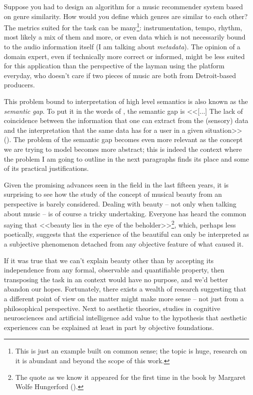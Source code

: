 Suppose you had to design an algorithm for a music recommender system based on genre similarity. How would you define which genres are similar to each other? The metrics suited for the task can be many\footnote{This is just an example built on common sense; the topic is huge, research on it is abundant and beyond the scope of this work.}: instrumentation, tempo, rhythm, most likely a mix of them and more, or even data which is not necessarily bound to the audio information itself (I am talking about \emph{metadata}). The opinion of a domain expert, even if technically more correct or informed, might be less suited for this application than the perspective of the layman using the platform everyday, who doesn't care if two pieces of music are both from Detroit-based producers.

This problem bound to interpretation of high level semantics is also known as the \emph{semantic gap}. To put it in the words of \citeauthor{smeulders2000content}, the semantic gap is <<[...] The lack of coincidence between the information that one can extract from the (sensory) data and the interpretation that the same data has for a
user in a given situation>> (\cite{smeulders2000content}). The problem of the semantic gap becomes even more relevant as the concept we are trying to model becomes more abstract; this is indeed the context where the problem I am going to outline in the next paragraphs finds its place and some of its practical justifications.

Given the promising advances seen in the field in the last fifteen years, it is surprising to see how the study of the concept of musical beauty from an  perspective is barely considered. Dealing with beauty -- not only when talking about music -- is of course a tricky undertaking. Everyone has heard the common saying that <<beauty lies in the eye of the beholder>>\footnote{The quote as we know it appeared for the first time in the book  by Margaret Wolfe Hungerford  (\cite{hungerford1878molly}).}, which, perhaps less poetically, suggests that the experience of the beautiful can only be interpreted as a subjective phenomenon detached from any objective feature of what caused it.

If it was true that we can't explain beauty other than by accepting its independence from any formal, observable and quantifiable property, then transposing the task in an  context would have no purpose, and we'd better abandon our hopes. Fortunately, there exists a wealth of research suggesting that a different point of view on the matter might make more sense -- not just from a philosophical perspective. Next to aesthetic theories, studies in cognitive neurosciences and artificial intelligence add value to the hypothesis that aesthetic experiences can be explained at least in part by objective foundations.

